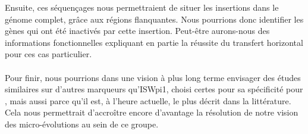 Ensuite, ces séquençages nous permettraient de situer les insertions dans le génome complet, grâce aux régions flanquantes. 
Nous pourrions donc identifier les gènes qui ont été inactivés par cette insertion. Peut-être aurons-nous des informations fonctionnelles expliquant en partie la réussite du transfert horizontal pour ces cas particulier.

\paragraph{} %
\label{par:vide}
Pour finir, nous pourrions dans une vision à plus long terme envisager des études similaires sur d'autres marqueurs qu'ISWpi1, choisi certes pour sa spécificité pour , mais aussi parce qu'il est, à l'heure actuelle, le plus décrit dans la littérature. Cela nous permettrait d'accroître encore d'avantage la résolution de notre vision des micro-évolutions au sein de ce groupe.


